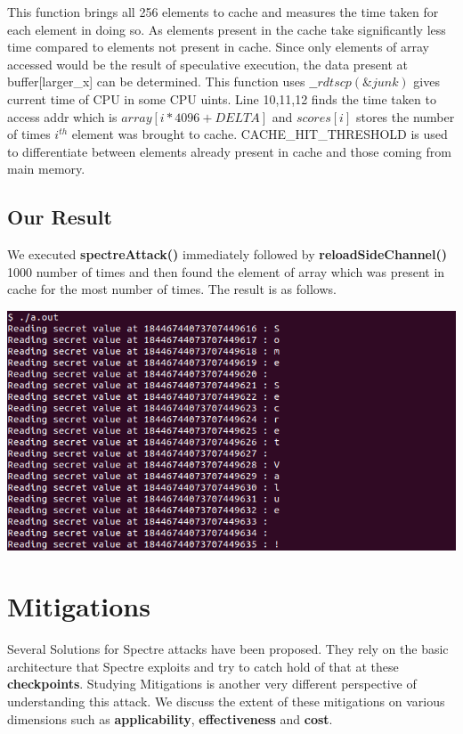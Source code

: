 \documentclass[12pt]{article}
\begin{document}
This function brings all 256 elements to cache and measures the time taken for each element in doing so. As elements present in the cache take significantly less time compared to elements not present in cache. Since only elements of array accessed would be the result of speculative execution, the data present at buffer[larger\_x] can be determined.
This function uses $\_\_rdtscp (\&junk)$ gives current time of CPU in some CPU uints.
Line 10,11,12 finds the time taken to access addr which is $array[i*4096+DELTA]$ and
$scores[i]$ stores the number of times $i^{th}$ element was brought to cache.
CACHE\_HIT\_THRESHOLD is used to differentiate between elements already present in cache and those coming from main memory.

  
\subsection{Our Result}

We executed \textbf{spectreAttack()} immediately followed by \textbf{reloadSideChannel()} 1000 number of times and then found the element of array which was present in cache for the most number of times. The result is as follows.

\vspace*{0.5 cm}
	{\centering
    \vspace*{0.5 cm}
\includegraphics[scale = 0.6]{spectre.png}\\[1.0 cm]}


\newpage
\section{Mitigations\cite{Kocher2018spectre}}
Several Solutions for Spectre attacks have been proposed. They rely on the basic architecture that Spectre exploits and try to catch hold of that at these \textbf{checkpoints}. Studying Mitigations is another very different perspective of understanding this attack. We discuss the extent of these mitigations on various dimensions such as \textbf{applicability}, \textbf{effectiveness} and \textbf{cost}.
\end{document}
